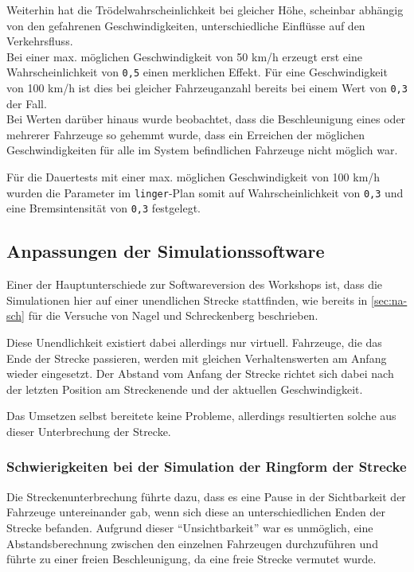 Weiterhin hat die Trödelwahrscheinlichkeit bei gleicher Höhe, scheinbar abhängig von den gefahrenen Geschwindigkeiten, unterschiedliche Einflüsse auf den Verkehrsfluss.
\\
Bei einer max. möglichen Geschwindigkeit von 50 km/h erzeugt erst eine Wahrscheinlichkeit von \texttt{0,5} einen merklichen Effekt. Für eine Geschwindigkeit von 100 km/h ist dies bei gleicher Fahrzeuganzahl bereits bei einem Wert von \texttt{0,3} der Fall.
\\
Bei Werten darüber hinaus wurde beobachtet, dass die Beschleunigung eines oder mehrerer Fahrzeuge so gehemmt wurde, dass ein Erreichen der möglichen Geschwindigkeiten für alle im System befindlichen Fahrzeuge nicht möglich war.

Für die Dauertests mit einer max. möglichen Geschwindigkeit von 100 km/h wurden die Parameter im \texttt{linger}-Plan somit auf Wahrscheinlichkeit von \texttt{0,3} und eine Bremsintensität von \texttt{0,3} festgelegt.





\subsection{Anpassungen der Simulationssoftware}
\label{sec:anpassungen-probleme}

Einer der Hauptunterschiede zur Softwareversion des Workshops ist, dass die Simulationen hier auf einer unendlichen Strecke stattfinden, wie bereits in \cref{sec:na-sch} für die Versuche von Nagel und Schreckenberg beschrieben.

Diese Unendlichkeit existiert dabei allerdings nur virtuell.
Fahrzeuge, die das Ende der Strecke passieren, werden mit gleichen Verhaltenswerten am Anfang wieder eingesetzt.
Der Abstand vom Anfang der Strecke richtet sich dabei nach der letzten Position am Streckenende und der aktuellen Geschwindigkeit.

Das Umsetzen selbst bereitete keine Probleme, allerdings resultierten solche aus dieser Unterbrechung der Strecke.



\subsubsection{Schwierigkeiten bei der Simulation der Ringform der Strecke}
\label{sec:probleme-ringform}

Die Streckenunterbrechung führte dazu, dass es eine Pause in der Sichtbarkeit der Fahrzeuge untereinander gab, wenn sich diese an unterschiedlichen Enden der Strecke befanden.
Aufgrund dieser \enquote{Unsichtbarkeit} war es unmöglich, eine Abstandsberechnung zwischen den einzelnen Fahrzeugen durchzuführen und führte zu einer freien Beschleunigung, da eine freie Strecke vermutet wurde.

